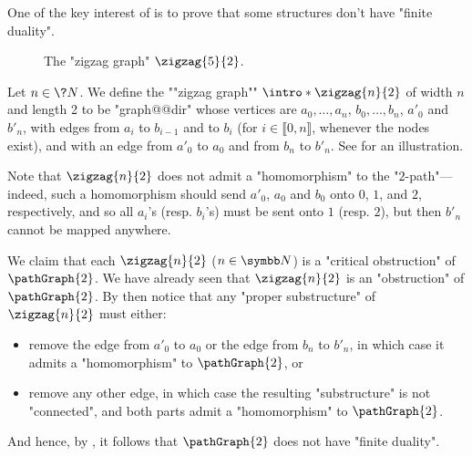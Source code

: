 One of the key interest of  is
to prove that some structures don't have "finite duality".

\begin{figure}
	\centering
	\begin{tikzpicture}
		
		
	\end{tikzpicture}
	\caption{\AP\label{fig:zigzag-graph}The "zigzag graph" $\zigzag{5}{2}$.}
\end{figure}
\begin{example}
	\AP\label{ex:dual-P2}
	Let $n\in\?N$.
	We define the \AP""zigzag graph"" $\intro*\zigzag{n}{2}$ of width $n$ and length 2
	to be "graph@@dir" whose vertices are $a_0, \hdots, a_n$, $b_0, \hdots, b_{n}$,
	$a'_0$ and $b'_n$, with edges from $a_i$ to $b_{i-1}$ and to $b_{i}$ (for $i \in \lBrack 0,n\rBrack$, whenever the nodes exist), and with an edge from $a'_0$ to $a_0$ and from $b_n$
	to $b'_n$. See  for an illustration.
	
	Note that $\zigzag{n}{2}$ does not admit a "homomorphism" to the "$2$-path"---indeed, such a homomorphism should send $a'_0$, $a_0$ and $b_0$ onto $0$, $1$, and $2$, respectively, 
	and so all $a_i$'s (resp. $b_i$'s) must be sent onto $1$ (resp. $2$), but then $b'_n$ cannot be mapped anywhere.

	We claim that each $\zigzag{n}{2}$ ($n\in\N$) is a "critical obstruction" of $\pathGraph{2}$.
	We have already seen that $\zigzag{n}{2}$ is an "obstruction" of $\pathGraph{2}$.
	By then notice that any "proper substructure" of $\zigzag{n}{2}$ 
	must either:
	\begin{itemize}
		\item remove the edge from $a'_0$ to $a_0$ or the edge from $b_n$ to $b'_n$,
		in which case it admits a "homomorphism" to $\pathGraph{2}$, or
		\item remove any other edge, in which case the resulting "substructure" is not "connected",
		and both parts admit a "homomorphism" to $\pathGraph{2}$.
	\end{itemize}
	And hence, by , it follows that
	$\pathGraph{2}$ does not have "finite duality".


\end{example}

